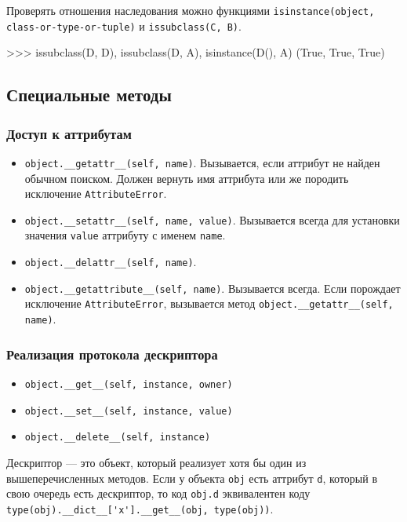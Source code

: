 Проверять отношения наследования можно функциями \lstinline{isinstance(object, class-or-type-or-tuple)} и \lstinline{issubclass(C, B)}.
\begin{pylst}{}{}
>>> issubclass(D, D), issubclass(D, A), isinstance(D(), A)
(True, True, True)
\end{pylst}

\subsection{Специальные методы}

\subsubsection{Доступ к аттрибутам}
\begin{itemize}
  \item \lstinline{object.__getattr__(self, name)}. Вызывается, если аттрибут не найден обычном поиском. Должен вернуть имя аттрибута или же породить исключение \lstinline{AttributeError}.
  \item \lstinline{object.__setattr__(self, name, value)}. Вызывается всегда для установки значения \lstinline{value} аттрибуту с именем \lstinline{name}.
  \item \lstinline{object.__delattr__(self, name)}.
  \item \lstinline{object.__getattribute__(self, name)}. Вызывается всегда. Если порождает исключение \lstinline{AttributeError}, вызывается метод \lstinline{object.__getattr__(self, name)}.
\end{itemize}

\subsubsection{Реализация протокола дескриптора}
\begin{itemize}
  \item \lstinline{object.__get__(self, instance, owner)}
  \item \lstinline{object.__set__(self, instance, value)}
  \item \lstinline{object.__delete__(self, instance)}
\end{itemize}

Дескриптор --- это объект, который реализует хотя бы один из вышеперечисленных методов. Если у объекта \lstinline{obj} есть аттрибут \lstinline{d}, который в свою очередь есть дескриптор, то код \lstinline{obj.d} эквивалентен коду \lstinline{type(obj).__dict__['x'].__get__(obj, type(obj))}.

